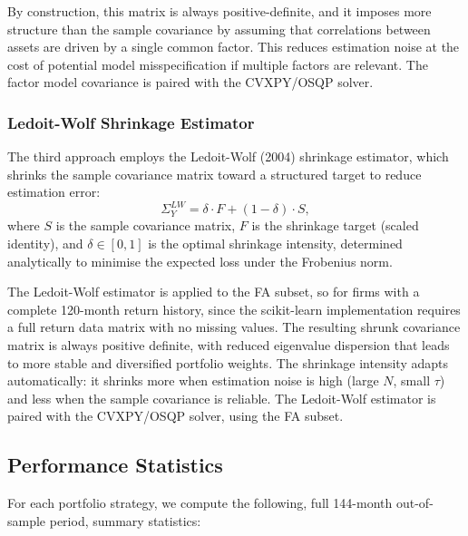 \documentclass[11pt,a4paper]{article}
\begin{document}
By construction, this matrix is always positive-definite, and it imposes more structure than the sample covariance by assuming that correlations between assets are driven by a single common factor. This reduces estimation noise at the cost of potential model misspecification if multiple factors are relevant. The factor model covariance is paired with the CVXPY/OSQP solver.

\subsubsection{Ledoit-Wolf Shrinkage Estimator}

The third approach employs the Ledoit-Wolf (2004) shrinkage estimator, which shrinks the sample covariance matrix toward a structured target to reduce estimation error:
\begin{equation}
\Sigma_Y^{LW} = \delta \cdot F + (1 - \delta) \cdot S,
\end{equation}
where \(S\) is the sample covariance matrix, \(F\) is the shrinkage target (scaled identity), and \(\delta \in [0,1]\) is the optimal shrinkage intensity, determined analytically to minimise the expected loss under the Frobenius norm.

The Ledoit-Wolf estimator is applied to the FA subset, so for firms with a complete 120-month return history, since the scikit-learn implementation requires a full return data matrix with no missing values. The resulting shrunk covariance matrix is always positive definite, with reduced eigenvalue dispersion that leads to more stable and diversified portfolio weights. The shrinkage intensity adapts automatically: it shrinks more when estimation noise is high (large \(N\), small \(\tau\)) and less when the sample covariance is reliable. The Ledoit-Wolf estimator is paired with the CVXPY/OSQP solver, using the FA subset.

\subsection{Performance Statistics}

For each portfolio strategy, we compute the following, full 144-month out-of-sample period, summary statistics:
\end{document}
